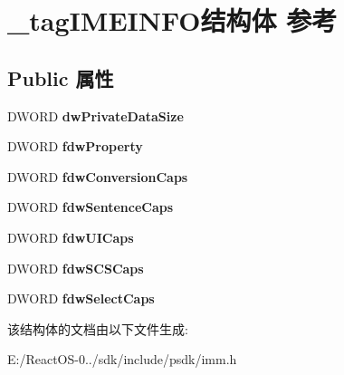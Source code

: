 \hypertarget{struct__tag_i_m_e_i_n_f_o}{}\section{\+\_\+tag\+I\+M\+E\+I\+N\+F\+O结构体 参考}
\label{struct__tag_i_m_e_i_n_f_o}
\subsection*{Public 属性}
\begin{DoxyCompactItemize}
\item 
\mbox{\label{struct__tag_i_m_e_i_n_f_o_ad7cfa00a4be0714c4d71cbf263302524}} 
D\+W\+O\+RD {\bfseries dw\+Private\+Data\+Size}
\item 
\mbox{\label{struct__tag_i_m_e_i_n_f_o_ac92b90411b6f90806d8b7bde9d216a0d}} 
D\+W\+O\+RD {\bfseries fdw\+Property}
\item 
\mbox{\label{struct__tag_i_m_e_i_n_f_o_abe604265afd21e8b1be20c2b4a8bc1c6}} 
D\+W\+O\+RD {\bfseries fdw\+Conversion\+Caps}
\item 
\mbox{\label{struct__tag_i_m_e_i_n_f_o_a8106898e54c928a9d2905d1f9a5d0443}} 
D\+W\+O\+RD {\bfseries fdw\+Sentence\+Caps}
\item 
\mbox{\label{struct__tag_i_m_e_i_n_f_o_afba7d791a2956e09ee7ecc772e7b08fe}} 
D\+W\+O\+RD {\bfseries fdw\+U\+I\+Caps}
\item 
\mbox{\label{struct__tag_i_m_e_i_n_f_o_ac7b35c28b380eabac459b79ea77a2c8c}} 
D\+W\+O\+RD {\bfseries fdw\+S\+C\+S\+Caps}
\item 
\mbox{\label{struct__tag_i_m_e_i_n_f_o_a1c05ee6a93fcaa9017f2fc5e430e0461}} 
D\+W\+O\+RD {\bfseries fdw\+Select\+Caps}
\end{DoxyCompactItemize}


该结构体的文档由以下文件生成\+:\begin{DoxyCompactItemize}
\item 
E\+:/\+React\+O\+S-\/0../sdk/include/psdk/imm.\+h\end{DoxyCompactItemize}
